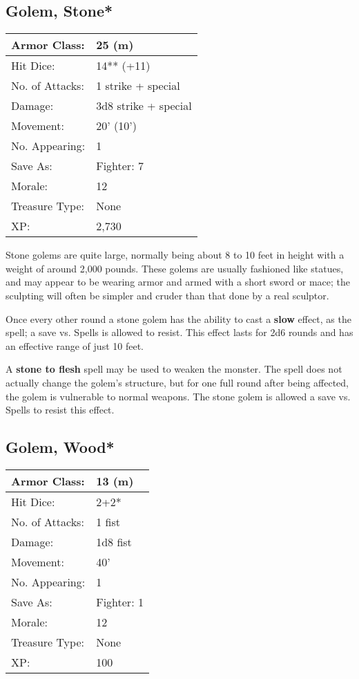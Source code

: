 \documentclass[a4paper,twoside,openany,10pt]{book}
\begin{document}
\begin{multicols}{2}
\subsection*{Golem, Stone*}\label{golem-stone}

\begin{tabularx}{0.48\textwidth}{@{}lX@{}}
Armor Class: & 25 (m) \\\hline
Hit Dice: & 14** (+11)  \\\hline
No. of Attacks: & 1 strike + special \\\hline
Damage: & 3d8 strike + special \\\hline
Movement: & 20' (10') \\\hline
No. Appearing: & 1 \\\hline
Save As: & Fighter: 7 \\\hline
Morale: & 12 \\\hline
Treasure Type: & None \\\hline
XP: & 2,730 \\\hline
\end{tabularx}\medskip

Stone golems are quite large, normally being about 8 to 10 feet in height with a weight of around 2,000 pounds. These golems are usually fashioned like statues, and may appear to be wearing armor and armed with a short sword or mace; the sculpting will often be simpler and cruder than that done by a real sculptor.

Once every other round a stone golem has the ability to cast a \textbf{slow }effect, as the spell; a save vs. Spells is allowed to resist. This effect lasts for 2d6 rounds and has an effective range of just 10 feet.

A \textbf{stone to flesh }spell may be used to weaken the monster. The spell does not actually change the golem's structure, but for one full round after being affected, the golem is vulnerable to normal weapons. The stone golem is allowed a save vs. Spells to resist this effect.

\subsection*{Golem, Wood*}\label{golem-wood}

\begin{tabularx}{0.48\textwidth}{@{}lX@{}}
Armor Class: & 13 (m) \\\hline
Hit Dice: & 2+2* \\\hline
No. of Attacks: & 1 fist \\\hline
Damage: & 1d8 fist \\\hline
Movement: & 40' \\\hline
No. Appearing: & 1 \\\hline
Save As: & Fighter: 1 \\\hline
Morale: & 12 \\\hline
Treasure Type: & None \\\hline
XP: & 100 \\\hline
\end{tabularx}\medskip


\end{multicols}
\end{document}
